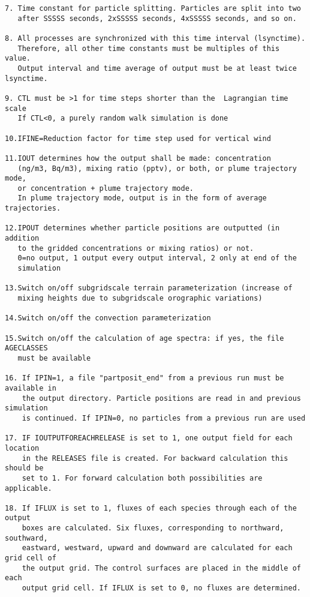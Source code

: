 \documentclass{egu}                  %
\begin{document}
\begin{scriptsize}
\begin{verbatim}
7. Time constant for particle splitting. Particles are split into two
   after SSSSS seconds, 2xSSSSS seconds, 4xSSSSS seconds, and so on.

8. All processes are synchronized with this time interval (lsynctime).
   Therefore, all other time constants must be multiples of this value.
   Output interval and time average of output must be at least twice lsynctime.

9. CTL must be >1 for time steps shorter than the  Lagrangian time scale
   If CTL<0, a purely random walk simulation is done

10.IFINE=Reduction factor for time step used for vertical wind

11.IOUT determines how the output shall be made: concentration
   (ng/m3, Bq/m3), mixing ratio (pptv), or both, or plume trajectory mode,
   or concentration + plume trajectory mode.
   In plume trajectory mode, output is in the form of average trajectories.

12.IPOUT determines whether particle positions are outputted (in addition
   to the gridded concentrations or mixing ratios) or not.
   0=no output, 1 output every output interval, 2 only at end of the
   simulation

13.Switch on/off subgridscale terrain parameterization (increase of
   mixing heights due to subgridscale orographic variations)

14.Switch on/off the convection parameterization

15.Switch on/off the calculation of age spectra: if yes, the file AGECLASSES
   must be available

16. If IPIN=1, a file "partposit_end" from a previous run must be available in
    the output directory. Particle positions are read in and previous simulation
    is continued. If IPIN=0, no particles from a previous run are used

17. IF IOUTPUTFOREACHRELEASE is set to 1, one output field for each location
    in the RELEASES file is created. For backward calculation this should be
    set to 1. For forward calculation both possibilities are applicable.

18. If IFLUX is set to 1, fluxes of each species through each of the output
    boxes are calculated. Six fluxes, corresponding to northward, southward,
    eastward, westward, upward and downward are calculated for each grid cell of
    the output grid. The control surfaces are placed in the middle of each
    output grid cell. If IFLUX is set to 0, no fluxes are determined.


\end{verbatim}
\end{scriptsize}
\end{document}
